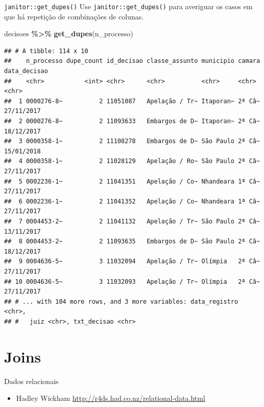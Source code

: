\documentclass[
  9pt,
  ignorenonframetext,
]{beamer}
\newenvironment{Shaded}{\begin{snugshade}}{\end{snugshade}}
\newcommand{\KeywordTok}[1]{\textcolor[rgb]{0.13,0.29,0.53}{\textbf{#1}}}
\newcommand{\NormalTok}[1]{#1}
\newcommand{\OperatorTok}[1]{\textcolor[rgb]{0.81,0.36,0.00}{\textbf{#1}}}
\newcommand{\StringTok}[1]{\textcolor[rgb]{0.31,0.60,0.02}{#1}}
\providecommand{\tightlist}{%
  \setlength{\itemsep}{0pt}\setlength{\parskip}{0pt}}
\begin{document}
\begin{frame}[fragile]{\texttt{janitor::get\_dupes()}}
\protect\hypertarget{janitorget_dupes}{}
Use \texttt{janitor::get\_dupes()} para averiguar os casos em que há
repetição de combinações de colunas.

\begin{Shaded}
\begin{Highlighting}[]
\NormalTok{decisoes }\OperatorTok{\%\textgreater{}\%}\StringTok{ }
\StringTok{  }\KeywordTok{get\_dupes}\NormalTok{(n\_processo)}
\end{Highlighting}
\end{Shaded}

\begin{verbatim}
## # A tibble: 114 x 10
##    n_processo dupe_count id_decisao classe_assunto municipio camara data_decisao
##    <chr>           <int> <chr>      <chr>          <chr>     <chr>  <chr>       
##  1 0000276-8~          2 11051087   Apelação / Tr~ Itaporan~ 2ª Câ~ 27/11/2017  
##  2 0000276-8~          2 11093633   Embargos de D~ Itaporan~ 2ª Câ~ 18/12/2017  
##  3 0000358-1~          2 11108278   Embargos de D~ São Paulo 2ª Câ~ 15/01/2018  
##  4 0000358-1~          2 11028129   Apelação / Ro~ São Paulo 2ª Câ~ 27/11/2017  
##  5 0002236-1~          2 11041351   Apelação / Co~ Nhandeara 1ª Câ~ 27/11/2017  
##  6 0002236-1~          2 11041352   Apelação / Co~ Nhandeara 1ª Câ~ 27/11/2017  
##  7 0004453-2~          2 11041132   Apelação / Tr~ São Paulo 2ª Câ~ 13/11/2017  
##  8 0004453-2~          2 11093635   Embargos de D~ São Paulo 2ª Câ~ 18/12/2017  
##  9 0004636-5~          3 11032094   Apelação / Tr~ Olímpia   2ª Câ~ 27/11/2017  
## 10 0004636-5~          3 11032093   Apelação / Tr~ Olímpia   2ª Câ~ 27/11/2017  
## # ... with 104 more rows, and 3 more variables: data_registro <chr>,
## #   juiz <chr>, txt_decisao <chr>
\end{verbatim}
\end{frame}

\hypertarget{joins}{%
\section{Joins}\label{joins}}

\begin{frame}{Dados relacionais}
\protect\hypertarget{dados-relacionais}{}
\begin{itemize}
\tightlist
\item
  Hadley Wickham \url{http://r4ds.had.co.nz/relational-data.html}
\end{itemize}
\end{frame}
\end{document}
